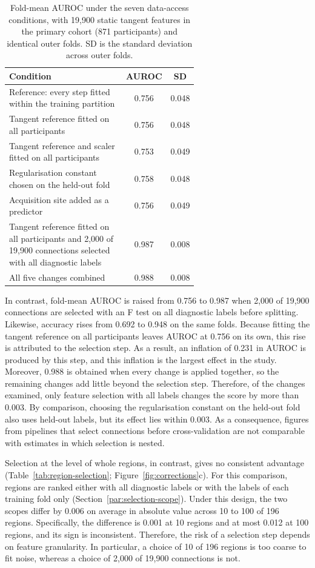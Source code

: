 \begin{table}[t]
\centering
\caption{Fold-mean AUROC under the seven data-access conditions, with 19,900 static tangent
features in the primary cohort (871 participants) and identical outer folds. SD is the
standard deviation across outer folds.}
\label{tab:selection-scope}
\small
\begin{tabular}{@{}>{\raggedright\arraybackslash}p{0.62\linewidth}cc@{}}
\toprule
Condition & AUROC & SD \\
\midrule
Reference: every step fitted within the training partition & 0.756 & 0.048 \\
Tangent reference fitted on all participants & 0.756 & 0.048 \\
Tangent reference and scaler fitted on all participants & 0.753 & 0.049 \\
Regularisation constant chosen on the held-out fold & 0.758 & 0.048 \\
Acquisition site added as a predictor & 0.756 & 0.049 \\
Tangent reference fitted on all participants and 2,000 of 19,900 connections selected with all diagnostic labels & 0.987 & 0.008 \\
All five changes combined & 0.988 & 0.008 \\
\bottomrule
\end{tabular}
\end{table}

In contrast, fold-mean AUROC is raised from 0.756 to 0.987 when 2,000 of 19,900 connections
are selected with an F test on all diagnostic labels before splitting. Likewise, accuracy
rises from 0.692 to 0.948 on the same folds. Because fitting the tangent reference on all
participants leaves AUROC at 0.756 on its own, this rise is attributed to the selection
step. As a result, an inflation of 0.231 in AUROC is produced by this step, and this
inflation is the largest effect in the study. Moreover, 0.988 is obtained when every change
is applied together, so the remaining changes add little beyond the selection step.
Therefore, of the changes examined, only feature selection with all labels changes the
score by more than 0.003. By comparison, choosing the regularisation constant on the
held-out fold also uses held-out labels, but its effect lies within 0.003. As a
consequence, figures from pipelines that select connections before cross-validation are
not comparable with estimates in which selection is nested.

Selection at the level of whole regions, in contrast, gives no consistent advantage
(Table~\ref{tab:region-selection}; Figure~\ref{fig:corrections}c). For this comparison, regions
are ranked either with all diagnostic labels or with the labels of each training fold only
(Section~\ref{par:selection-scope}). Under this design, the two scopes differ by 0.006 on average in
absolute value across 10 to 100 of 196 regions. Specifically, the difference is 0.001 at 10
regions and at most 0.012 at 100 regions, and its sign is inconsistent. Therefore, the risk
of a selection step depends on feature granularity. In particular, a choice of 10 of 196
regions is too coarse to fit noise, whereas a choice of 2,000 of 19,900 connections is not.

